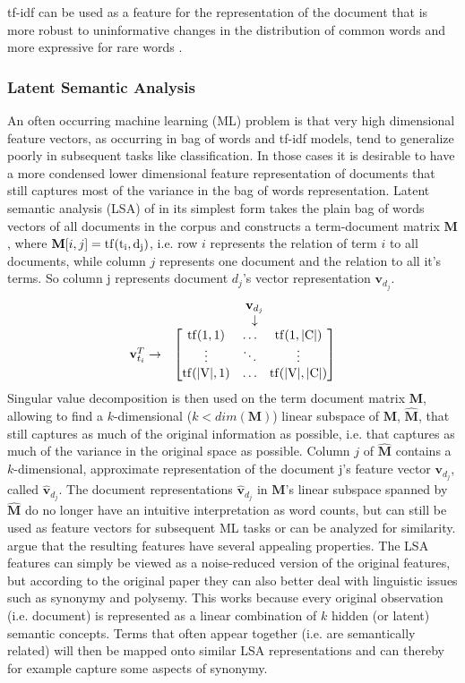 tf-idf can be used as a feature for the representation of the document
that is more robust to uninformative changes in the distribution of
common words and more expressive for rare words \citep{Manning2008vect}.


\subsubsection*{Latent Semantic Analysis}

An often occurring machine learning (ML) problem is that very high dimensional
feature vectors, as occurring in bag of words and tf-idf models,
tend to generalize poorly in subsequent tasks like classification.
In those cases it is desirable to have a more condensed lower dimensional
feature representation of documents that still captures most of the
variance in the bag of words representation. Latent semantic analysis
(LSA) of \citet{Deerwester1990} in its simplest form takes the plain bag of words
vectors of all documents in the corpus and constructs a term-document
matrix $\textbf{M}$, where $\textbf{M}[i,j]=\rm{tf}(t_{i},d_{j})$, i.e. row $i$ represents
the relation of term $i$ to all documents, while column $j$ represents
one document and the relation to all it's terms. So column j represents document $d_j$'s vector representation $\textbf{v}_{d_j}$.
\[ 
\begin{matrix} & \textbf{v}_{d_j}\\
& \downarrow\\
\textbf{v}_{t_i}^{T}\rightarrow & \begin{bmatrix}\rm{tf}(1,1) & \dots & \rm{tf}(1,|C|)\\
\vdots & \ddots & \vdots\\
\rm{tf}(|V|,1) & \dots & \rm{tf}(|V|,|C|)
\end{bmatrix}
\end{matrix}
\]
Singular value decomposition is then used on the term document matrix
$\textbf{M}$, allowing to find a $k$-dimensional ($k<dim(\textbf{M})$) linear subspace
of $\textbf{M}$, $\hat{\textbf{M}}$, that still captures as much of the original information
as possible, i.e. that captures as much of the variance in the original
space as possible. Column $j$ of $\hat{\textbf{M}}$ contains a $k$-dimensional,
approximate representation of the document j's feature vector $\textbf{v}_{d_{j}}$, called $\hat{\textbf{v}}_{d_{j}}$.
The document representations $\hat{\textbf{v}}_{d_j}$ in $\textbf{M}$'s linear subspace
spanned by $\hat{\textbf{M}}$ do no longer have an intuitive interpretation
as word counts, but can still be used as feature vectors for subsequent
ML tasks or can be analyzed for similarity. \citet{Deerwester1990} argue
that the resulting features have several appealing properties. The
LSA features can simply be viewed as a noise-reduced version of the
original features, but according to the original paper they can also
better deal with linguistic issues such as synonymy and polysemy.
This works because every original observation (i.e. document) is represented
as a linear combination of $k$ hidden (or latent) semantic concepts.
Terms that often appear together (i.e. are semantically related) will
then be mapped onto similar LSA representations and can thereby for
example capture some aspects of synonymy.


